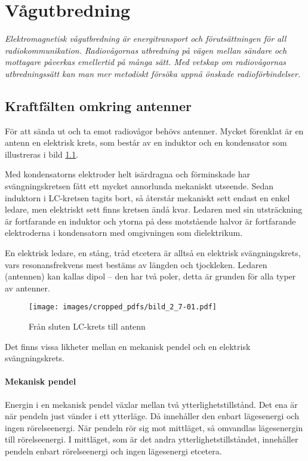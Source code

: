 \chapter{Vågutbredning}
\label{vågutbredning}

\emph{Elektromagnetisk vågutbredning är energitransport och
  förutsättningen för all radiokommunikation.
  Radiovågornas utbredning på vägen mellan sändare och mottagare påverkas
  emellertid på många sätt.
  Med vetskap om radiovågornas utbredningssätt kan man mer
  metodiskt försöka uppnå önskade radioförbindelser.}

\section[Kraftfält antenner]{Kraftfälten omkring antenner}

För att sända ut och ta emot radiovågor behövs antenner.
Mycket förenklat är en antenn en elektrisk krets, som består av en induktor
och en kondensator som illustreras i bild \ref{fig:BildII7-01}.

Med kondensatorns elektroder helt isärdragna och förminskade har
svängningskretsen fått ett mycket annorlunda mekaniskt utseende.
Sedan induktorn i LC-kretsen tagits bort, så återstår mekaniskt sett endast
en enkel ledare, men elektriskt sett finns kretsen ändå kvar.
Ledaren med sin utsträckning är fortfarande en induktor och ytorna på dess
motstående halvor är fortfarande elektroderna i kondensatorn med
omgivningen som dielektrikum.

En elektrisk ledare, en stång, tråd etcetera är alltså en elektrisk
svängningskrets, vars resonansfrekvens mest bestäms av längden och
tjockleken.  Ledaren (antennen) kan kallas dipol -- den har två poler,
detta är grunden för alla typer av antenner.

\begin{figure}
\texttt{[image: images/cropped\_pdfs/bild\_2\_7-01.pdf]}
\caption{Från sluten LC-krets till antenn}
\label{fig:BildII7-01}
\end{figure}

Det finns vissa likheter mellan en mekanisk pendel och en elektrisk
svängningskrets. 

\subsubsection{Mekanisk pendel}

Energin i en mekanisk pendel växlar mellan två ytterlighetstillstånd.
Det ena är när pendeln just vänder i ett ytterläge.
Då innehåller den enbart lägesenergi och ingen rörelseenergi.
När pendeln rör sig mot mittläget, så omvandlas lägesenergin till rörelseenergi.
I mittläget, som är det andra ytterlighetstillståndet, innehåller pendeln enbart
rörelseenergi och ingen lägesenergi etcetera.

